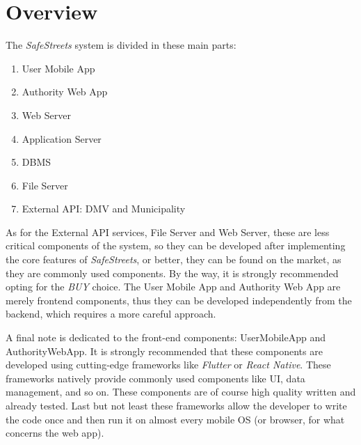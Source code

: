 \section{Overview}
The \emph{SafeStreets} system is divided in these main parts:
\begin{enumerate}
    \item User Mobile App
    \item Authority Web App
    \item Web Server
    \item Application Server
    \item DBMS
    \item File Server
    \item External API: DMV and Municipality
\end{enumerate}

As for the External API services, File Server and Web Server, these are less
critical components of the system, so they can be developed after implementing
the core features of \emph{SafeStreets}, or better, they can be found on the
market, as they are commonly used components. By the way, it is strongly
recommended opting for the \emph{BUY} choice. The User Mobile App and Authority
Web App are merely frontend components, thus they can be developed independently
from the backend, which requires a more careful approach.

A final note is dedicated to the front-end components: UserMobileApp and
AuthorityWebApp. It is strongly recommended that these components are developed
using cutting-edge frameworks like \emph{Flutter} or \emph{React Native}. These
frameworks natively provide commonly used components like UI, data management,
and so on. These components are of course high quality written and already
tested. Last but not least these frameworks allow the developer to write the
code once and then run it on almost every mobile OS (or browser, for what
concerns the web app).